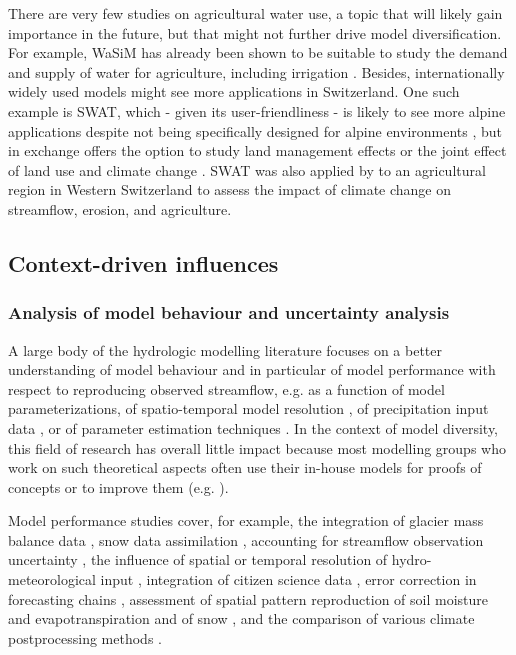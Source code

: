 \documentclass[10pt,a4paper]{article}
\begin{document}
There are very few studies on agricultural water use, a topic that will likely gain importance in the future, but that might not further drive model diversification. For example, WaSiM has already been shown to be suitable to study the demand and supply of water for agriculture, including irrigation \citep{Fuhrer2012}. Besides, internationally widely used models might see more applications in Switzerland. One such example is SWAT, which - given its user-friendliness \citep{Abbaspour2007} - is likely to see more alpine applications despite not being specifically designed for alpine environments \citep{Rahman2014, Andrianaki2019}, but in exchange offers the option to study land management effects \citep{Zarrineh2018} or the joint effect of land use and climate change \citep{Rahman2015}. SWAT was also applied by \citet{Zarrineh2020} to an agricultural region in Western Switzerland to assess the impact of climate change on streamflow, erosion, and agriculture.


\subsection{Context-driven influences}
\label{sec:application:context}


\subsubsection{Analysis of model behaviour and uncertainty analysis}
\label{sec:application:uncertainty}

A large body of the hydrologic modelling literature focuses on a better understanding of model behaviour and in particular of model performance with respect to reproducing observed streamflow, e.g. as a function of model parameterizations, of spatio-temporal model resolution \citep{Brunner2019}, of precipitation input data \citep{Sikorska2016, Sikorska2017, MullerThomy2019}, or of parameter estimation techniques \citep{Foglia2009, Cullmann2011}. In the context of model diversity, this field of research has overall little impact because most modelling groups who work on such theoretical aspects often use their in-house models for proofs of concepts or to improve them (e.g. \citealt{Schaefli2007, Hingray2010}).

Model performance studies cover, for example, the integration of glacier mass balance data \citep{Finger2015, Schaefli2011}, snow data assimilation \citep{Griessinger2016}, accounting for streamflow observation uncertainty \citep{Westerberg2020}, the influence of spatial or temporal resolution of hydro-meteorological input \citep{GironsLopez2016, Felder2017, Sikorska2018}, integration of citizen science data \citep{Etter2020}, error correction in forecasting chains \citep{Bogner2018}, assessment of spatial pattern reproduction of soil moisture and evapotranspiration \citep{Rossler2010, Zappa2003} and of snow \citep{Zappa2008a}, and the comparison of various climate postprocessing methods \citep{Rossler2019}.
\end{document}
